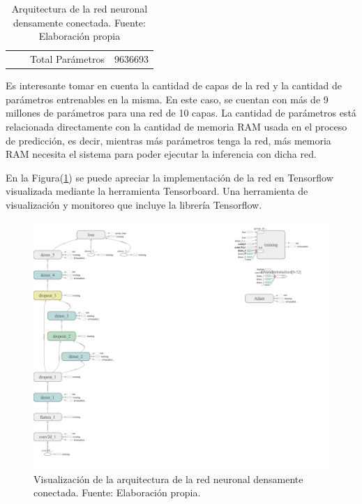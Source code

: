 \begin{table}[]
{\begin{tabular}{@{}cccccc@{}}
                                                & \multicolumn{1}{c|}{}              & \multicolumn{2}{c|}{Total Parámetros}                                                                                                                                                       & \multicolumn{2}{c|}{9636693}                                                                                                                                                                     \\ \cmidrule(l){3-6} 
            \end{tabular}%
            }
            \caption{Arquitectura de la red neuronal densamente conectada. Fuente: Elaboración propia}
            \label{tbl:arqdense}
        \end{table}

        Es interesante tomar en cuenta la cantidad de capas de la red y la cantidad de parámetros entrenables en la misma. En 
        este caso, se cuentan con más de 9 millones de parámetros para una red de 10 capas. La cantidad de parámetros 
        está relacionada directamente con la cantidad de memoria RAM usada en el proceso de predicción, es decir, mientras 
        más parámetros tenga la red, más memoria RAM necesita el sistema para poder ejecutar la inferencia con dicha red.

        En la Figura(\ref{fig:arqdense}) se puede apreciar la implementación de la red en Tensorflow visualizada mediante la herramienta 
        Tensorboard. Una herramienta de visualización y monitoreo que incluye la librería Tensorflow.

        \begin{figure}[!ht] 
            \centering
            \includegraphics[width=\textwidth]{img/arqdense}
            \caption[Arquitectura de la red neuronal densamente conectada]{Visualización de la arquitectura de la red neuronal densamente conectada. Fuente: Elaboración propia. }
            \label{fig:arqdense}
        \end{figure}

